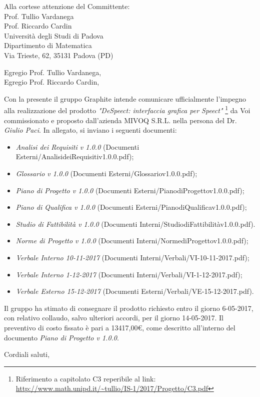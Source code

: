 \documentclass[]{letter}
\begin{document}
\begin{letter}{
		Alla cortese attenzione del Committente: \\
		Prof. Tullio Vardanega \\
		Prof. Riccardo Cardin \\
		Università degli Studi di Padova \\
		Dipartimento di Matematica \\ 
		Via Trieste, 62, 35131 Padova (PD)
}

\opening{Egregio Prof. Tullio Vardanega, \\ Egregio Prof. Riccardo Cardin,}

Con la presente il gruppo Graphite intende comunicare ufficialmente l’impegno alla realizzazione del prodotto  \textit{"DeSpeect: interfaccia grafica per Speect"} \footnote{Riferimento a capitolato C3 reperibile al link: \url{http://www.math.unipd.it/~tullio/IS-1/2017/Progetto/C3.pdf}} da Voi commissionato e proposto dall'azienda MIVOQ S.R.L. nella persona del Dr. \textit{Giulio Paci}.  In  allegato,  si inviano i seguenti documenti:

\begin{itemize}
	\item \textit{Analisi dei Requisiti v 1.0.0} (Documenti Esterni/AnalisideiRequisitiv1.0.0.pdf);
	\item \textit{Glossario v 1.0.0} (Documenti Esterni/Glossariov1.0.0.pdf);
	\item \textit{Piano di Progetto v 1.0.0} (Documenti Esterni/PianodiProgettov1.0.0.pdf);
	\item \textit{Piano di Qualifica v 1.0.0} (Documenti Esterni/PianodiQualificav1.0.0.pdf);
	\item \textit{Studio di Fattibilità v 1.0.0} (Documenti Interni/StudiodiFattibilitàv1.0.0.pdf).
	\item \textit{Norme di Progetto v 1.0.0} (Documenti Interni/NormediProgettov1.0.0.pdf);
	\item \textit{Verbale Interno 10-11-2017} (Documenti Interni/Verbali/VI-10-11-2017.pdf);
	\item \textit{Verbale Interno 1-12-2017} (Documenti Interni/Verbali/VI-1-12-2017.pdf);
	\item \textit{Verbale Esterno 15-12-2017} (Documenti Esterni/Verbali/VE-15-12-2017.pdf).
\end{itemize}

Il gruppo ha stimato di consegnare il prodotto richiesto entro il giorno 6-05-2017, con relativo collaudo, salvo ulteriori accordi, per il giorno 14-05-2017. Il preventivo di costo fissato è pari a 13417,00\euro, come descritto all’interno del documento \textit{Piano di Progetto v 1.0.0}.

\signature{Responsabile di Progetto \\ Graphite}

\closing{Cordiali saluti,}


\end{letter}
\end{document}
